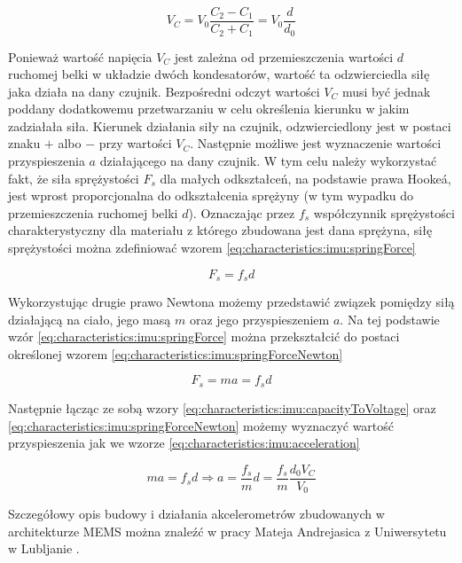 \begin{equation}
	V_C = V_0 \frac{C_2-C_1}{C_2+C_1} = V_0\frac{d}{d_0}
	\label{eq:characteristics:imu:capacityToVoltage}
\end{equation}
	
	Ponieważ wartość napięcia $V_C$ jest zależna od przemieszczenia wartości $d$ ruchomej belki w układzie dwóch kondesatorów, wartość ta odzwierciedla siłę jaka działa na dany czujnik. Bezpośredni odczyt wartości $V_C$ musi być jednak poddany dodatkowemu przetwarzaniu w celu określenia kierunku w jakim zadziałała siła. Kierunek działania siły na czujnik, odzwierciedlony jest w postaci znaku $+$ albo $-$ przy wartości $V_C$. Następnie możliwe jest wyznaczenie wartości przyspieszenia $a$ działającego na dany czujnik. W tym celu należy wykorzystać fakt, że siła sprężystości $F_s$ dla małych odkształceń, na podstawie prawa Hooke\'a, jest wprost proporcjonalna do odkształcenia sprężyny (w tym wypadku do przemieszczenia ruchomej belki $d$). Oznaczając przez $f_s$ współczynnik sprężystości charakterystyczny dla materiału z którego zbudowana jest dana sprężyna, siłę sprężystości można zdefiniować wzorem \eqref{eq:characteristics:imu:springForce}

\begin{equation}
	F_s = f_s d
	\label{eq:characteristics:imu:springForce}
\end{equation}	
	
	Wykorzystując drugie prawo Newtona możemy przedstawić związek pomiędzy siłą działającą na ciało, jego masą $m$ oraz jego przyspieszeniem $a$. Na tej podstawie wzór \eqref{eq:characteristics:imu:springForce} można przekształcić do postaci określonej wzorem \eqref{eq:characteristics:imu:springForceNewton}

\begin{equation}
	F_s = ma = f_s d
	\label{eq:characteristics:imu:springForceNewton}
\end{equation}	

Następnie łącząc ze sobą wzory \eqref{eq:characteristics:imu:capacityToVoltage} oraz \eqref{eq:characteristics:imu:springForceNewton} możemy wyznaczyć wartość przyspieszenia jak we wzorze \eqref{eq:characteristics:imu:acceleration}

\begin{equation}
	ma = f_s d \Rightarrow a = \frac{f_s}{m} d = \frac{f_s}{m} \frac{d_0 V_C}{V_0}
	\label{eq:characteristics:imu:acceleration}
\end{equation}

Szczegółowy opis budowy i działania akcelerometrów zbudowanych w architekturze MEMS można znaleźć w pracy Mateja Andrejasica z Uniwersytetu w Lubljanie \cite{Andrejasic2008}.

